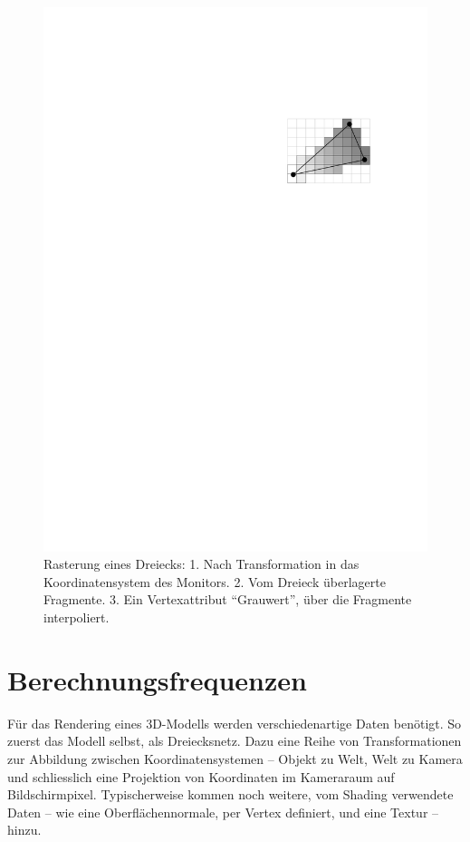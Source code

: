 \documentclass[twoside,a4paper,fleqn,12pt]{book}
\begin{document}
\begin{figure}[h]
  \includegraphics[scale=0.8]{triraster3}
  \caption{Rasterung eines Dreiecks: 1. Nach Transformation in das Koordinatensystem des Monitors.
  2. Vom Dreieck überlagerte Fragmente. 3. Ein Vertexattribut "`Grauwert"', über die Fragmente interpoliert.}
  \label{fig:triraster}
\end{figure}



\section{Berechnungsfrequenzen}
\label{berechnungsfrequenz_locker}

Für das Rendering eines 3D-Modells werden verschiedenartige Daten benötigt. So zuerst das Modell selbst, als Dreiecksnetz. Dazu
eine Reihe von Transformationen zur Abbildung zwischen Koordinatensystemen -- Objekt zu Welt, Welt zu Kamera und schliesslich
eine Projektion von Koordinaten im Kameraraum auf Bildschirmpixel. Typischerweise kommen noch weitere, vom Shading verwendete Daten --
wie eine Oberflächennormale, per Vertex definiert, und eine Textur -- hinzu.
\end{document}
